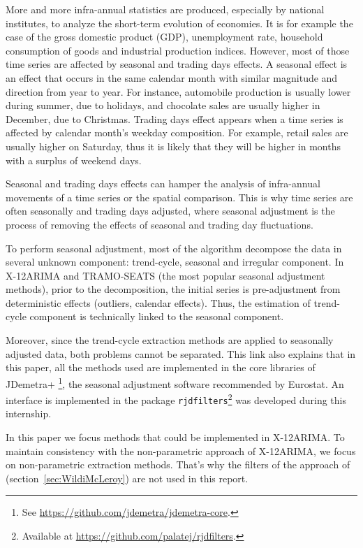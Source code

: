 \documentclass[
  12pt,
  ,
  a4paper]{article}
\newcommand\1{\mathds{1}}
\begin{document}
More and more infra-annual statistics are produced, especially by national institutes, to analyze the short-term evolution of economies.
It is for example the case of the gross domestic product (GDP), unemployment rate, household consumption of goods and industrial production indices.
However, most of those time series are affected by seasonal and trading days effects.
A seasonal effect is an effect that occurs in the same calendar month with similar magnitude and direction from year to year.
For instance, automobile production is usually lower during summer, due to holidays, and chocolate sales are usually higher in December, due to Christmas.
Trading days effect appears when a time series is affected by calendar month's weekday composition.
For example, retail sales are usually higher on Saturday, thus it is likely that they will be higher in months with a surplus of weekend days.

Seasonal and trading days effects can hamper the analysis of infra-annual movements of a time series or the spatial comparison.
This is why time series are often seasonally and trading days adjusted, where seasonal adjustment is the process of removing the effects of seasonal and trading day fluctuations.

To perform seasonal adjustment, most of the algorithm decompose the data in several unknown component: trend-cycle, seasonal and irregular component.
In X-12ARIMA and TRAMO-SEATS (the most popular seasonal adjustment methods), prior to the decomposition, the initial series is pre-adjustment from deterministic effects (outliers, calendar effects).
Thus, the estimation of trend-cycle component is technically linked to the seasonal component.

Moreover, since the trend-cycle extraction methods are applied to seasonally adjusted data, both problems cannot be separated.
This link also explains that in this paper, all the methods used are implemented in the core libraries of JDemetra+ \footnote{See \url{https://github.com/jdemetra/jdemetra-core}.}, the seasonal adjustment software recommended by Eurostat.
An  interface is implemented in the package \texttt{rjdfilters}\footnote{Available at \url{https://github.com/palatej/rjdfilters}.} was developed during this internship.

In this paper we focus methods that could be implemented in X-12ARIMA.
To maintain consistency with the non-parametric approach of X-12ARIMA, we focus on non-parametric extraction methods.
That's why the filters of the approach of \textcite{trilemmaWMR2019} (section~\ref{sec:WildiMcLeroy}) are not used in this report.
\end{document}
